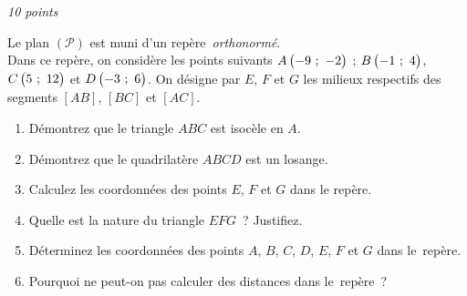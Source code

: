 \documentclass[a4paper,12pt,twocolumn,landscape]{article}
\begin{document}
\vspace*{1em}

\begin{minipage}{0.45\textwidth}
\thispagestyle{firststyle}

\vspace*{1em}

%


\exercice\hfill \emph{10 points}

Le plan $\left(\mathscr{P}\right)$ est muni d'un repère~\emph{orthonormé}.\\ Dans ce repère, on considère les points suivants $A\begin{pmatrix}-9~;~-2\end{pmatrix}$ ; $B\begin{pmatrix}-1~;~4\end{pmatrix}$, $C\begin{pmatrix}5~;~12\end{pmatrix}$ et $D\begin{pmatrix}-3~;~6\end{pmatrix}$.
On désigne par $E$, $F$ et $G$ les milieux respectifs des segments $\left[AB\right]$,  $\left[BC\right]$ et $\left[AC\right]$.

\begin{enumerate}
	\item Démontrez que le triangle $ABC$ est isocèle en $A$.
	\item Démontrez que le quadrilatère $ABCD$ est un losange.
	\item Calculez les coordonnées des points $E$, $F$ et $G$ dans le repère.
	\item Quelle est la nature du triangle $EFG$~? Justifiez.
	\item Déterminez les coordonnées des points $A$, $B$, $C$, $D$, $E$, $F$ et $G$ dans le~repère.
	\item Pourquoi ne peut-on pas calculer des distances dans le~repère~?
\end{enumerate}


\end{minipage}
\end{document}
